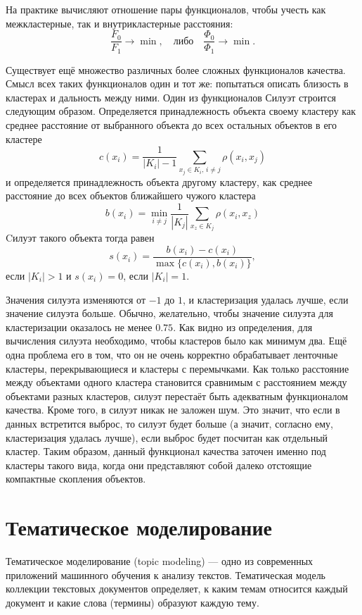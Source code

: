 \documentclass[article, 10pt]{disser}
\begin{document}
На практике вычисляют отношение пары функционалов, чтобы учесть как межкластерные, так и внутрикластерные расстояния:
\begin{equation*}
    \frac{F_0}{F_1} \rightarrow \min,\quad \text{либо}\quad \frac{\Phi_0}{\Phi_1} \rightarrow \min.
\end{equation*}

Существует ещё множество различных более сложных функционалов качества. Смысл всех таких функционалов один и тот же: попытаться описать близость в кластерах и дальность между ними. Один из функционалов Силуэт строится следующим образом. Определяется принадлежность объекта своему кластеру как среднее расстояние от выбранного объекта до всех остальных объектов в его кластере
\begin{equation*}
    c(x_i) = \frac{1}{|K_i| - 1}\sum\limits_{x_j \in K_i,\, i\neq j}\rho(x_i, x_j)
\end{equation*}
и определяется принадлежность объекта другому кластеру, как среднее расстояние до всех объектов ближайшего чужого кластера
\begin{equation*}
    b(x_i) = \min\limits_{i\neq j}\frac{1}{|K_j|}\sum\limits_{x_z \in K_j}\rho(x_i, x_z)
\end{equation*}
Cилуэт такого объекта тогда равен
\begin{equation*}
    s(x_i) = \frac{b(x_i) - c(x_i)}{\max\{c(x_i), b(x_i)\}},
\end{equation*}
если $|K_i| > 1$ и $s(x_i) = 0$, если $|K_i| = 1$.

Значения силуэта изменяются от $-1$ до $1$, и кластеризация удалась лучше, если значение силуэта больше. Обычно, желательно, чтобы значение силуэта для кластеризации оказалось не менее $0.75$. Как видно из определения, для вычисления силуэта необходимо, чтобы кластеров было как минимум два. Ещё одна проблема его в том, что он не очень корректно обрабатывает ленточные кластеры, перекрывающиеся и кластеры с перемычками. Как только расстояние между объектами одного кластера становится сравнимым с расстоянием между объектами разных кластеров, силуэт перестаёт быть адекватным функционалом качества. Кроме того, в силуэт никак не заложен шум. Это значит, что если в данных встретится выброс, то силуэт будет больше (а значит, согласно ему, кластеризация удалась лучше), если выброс будет посчитан как отдельный кластер. Таким образом, данный функционал качества заточен именно под кластеры такого вида, когда они представляют собой далеко отстоящие компактные скопления объектов.

\chapter{Тематическое моделирование}
Тематическое моделирование (topic modeling) — одно из современных приложений машинного обучения к анализу текстов. Тематическая модель коллекции текстовых документов определяет, к каким темам относится каждый документ и какие слова (термины) образуют
каждую тему.
\end{document}
